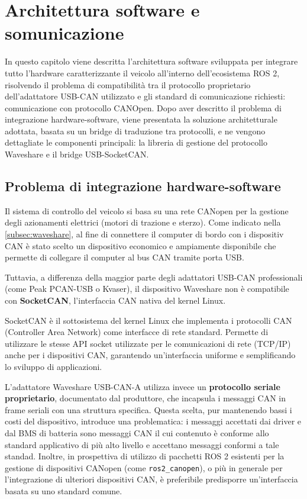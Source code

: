 \chapter{Architettura software e somunicazione}
\label{chap:software-comunicazione}

In questo capitolo viene descritta l'architettura software sviluppata per integrare tutto l'hardware caratterizzante il veicolo all'interno dell'ecosistema ROS 2, risolvendo il problema di compatibilità tra il protocollo proprietario dell'adattatore USB-CAN utilizzato e gli standard di comunicazione richiesti: comunicazione con protocollo CANOpen. Dopo aver descritto il problema di integrazione hardware-software, viene presentata la soluzione architetturale adottata, basata su un bridge di traduzione tra protocolli, e ne vengono dettagliate le componenti principali: la libreria di gestione del protocollo Waveshare e il bridge USB-SocketCAN.

\section{Problema di integrazione hardware-software}

Il sistema di controllo del veicolo si basa su una rete CANopen per la gestione degli azionamenti elettrici (motori di trazione e sterzo). Come indicato nella \cref{subsec:waveshare}, al fine di connettere il computer di bordo con i dispositiv CAN è stato scelto un dispositivo economico e ampiamente disponibile che permette di collegare il computer al bus CAN tramite porta USB.

Tuttavia, a differenza della maggior parte degli adattatori USB-CAN professionali (come Peak PCAN-USB o Kvaser), il dispositivo Waveshare non è compatibile con \textbf{SocketCAN}, l'interfaccia CAN nativa del kernel Linux.

\begin{note}
    SocketCAN è il sottosistema del kernel Linux che implementa i protocolli CAN (Controller Area Network) come interfacce di rete standard. Permette di utilizzare le stesse API socket utilizzate per le comunicazioni di rete (TCP/IP) anche per i dispositivi CAN, garantendo un'interfaccia uniforme e semplificando lo sviluppo di applicazioni.
\end{note}

L'adattatore Waveshare USB-CAN-A utilizza invece un \textbf{protocollo seriale proprietario}, documentato dal produttore, che incapsula i messaggi CAN in frame seriali con una struttura specifica. Questa scelta, pur mantenendo bassi i costi del dispositivo, introduce una problematica: i messaggi accettati dai driver e dal BMS di batteria sono messaggi CAN il cui contenuto è conforme allo standard applicativo di più alto livello e accettano messaggi conformi a tale standad. Inoltre, in prospettiva di utilizzo di pacchetti ROS 2 esistenti per la gestione di dispositivi CANopen (come \texttt{ros2\_canopen}), o più in generale per l'integrazione di ulteriori dispositivi CAN, è preferibile predisporre un'interfaccia basata su uno standard comune.

